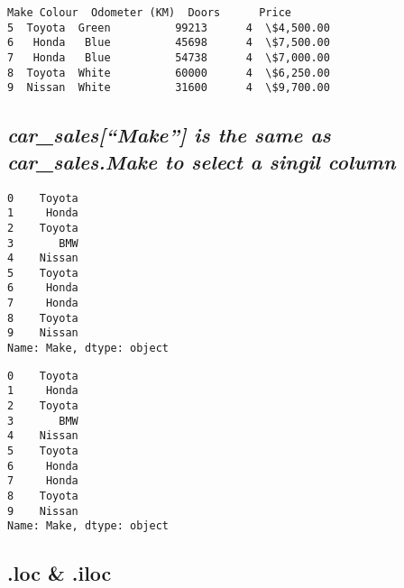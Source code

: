 \documentclass[11pt]{article}
\begin{document}
            \begin{tcolorbox}[breakable, size=fbox, boxrule=.5pt, pad at break*=1mm, opacityfill=0]
\begin{Verbatim}[commandchars=\\\{\}]
     Make Colour  Odometer (KM)  Doors      Price
5  Toyota  Green          99213      4  \$4,500.00
6   Honda   Blue          45698      4  \$7,500.00
7   Honda   Blue          54738      4  \$7,000.00
8  Toyota  White          60000      4  \$6,250.00
9  Nissan  White          31600      4  \$9,700.00
\end{Verbatim}
\end{tcolorbox}
        
    \hypertarget{car_salesmake-is-the-same-as-car_sales.make-to-select-a-singil-column}{%
\subsection{\texorpdfstring{\textbf{\emph{car\_sales{[}``Make''{]} is
the same as car\_sales.Make to select a singil
column}}}{car\_sales{[}``Make''{]} is the same as car\_sales.Make to select a singil column}}\label{car_salesmake-is-the-same-as-car_sales.make-to-select-a-singil-column}}

            \begin{tcolorbox}[breakable, size=fbox, boxrule=.5pt, pad at break*=1mm, opacityfill=0]
\begin{Verbatim}[commandchars=\\\{\}]
0    Toyota
1     Honda
2    Toyota
3       BMW
4    Nissan
5    Toyota
6     Honda
7     Honda
8    Toyota
9    Nissan
Name: Make, dtype: object
\end{Verbatim}
\end{tcolorbox}
        
            \begin{tcolorbox}[breakable, size=fbox, boxrule=.5pt, pad at break*=1mm, opacityfill=0]
\begin{Verbatim}[commandchars=\\\{\}]
0    Toyota
1     Honda
2    Toyota
3       BMW
4    Nissan
5    Toyota
6     Honda
7     Honda
8    Toyota
9    Nissan
Name: Make, dtype: object
\end{Verbatim}
\end{tcolorbox}
        
    \hypertarget{loc-.iloc}{%
\subsection{\texorpdfstring{\textbf{.loc \&
.iloc}}{.loc \& .iloc}}\label{loc-.iloc}}
\end{document}
